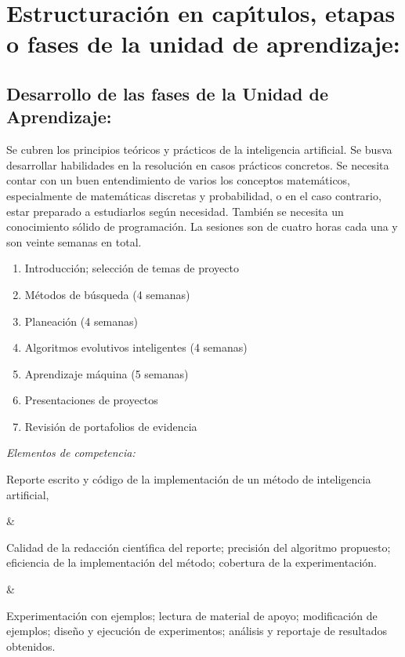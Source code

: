 \documentclass[10 pt]{article}
\begin{document}
\newpage
\section{Estructuraci\'{o}n en cap\'{\i}tulos, etapas o fases de la unidad de
  aprendizaje:}
\subsection{Desarrollo de las fases de la Unidad de Aprendizaje:}

Se cubren los principios te\'{o}ricos y pr\'{a}cticos de la
inteligencia artificial. Se busva desarrollar habilidades en la
resoluci\'{o}n en casos pr\'{a}cticos concretos. Se necesita contar
con un buen entendimiento de varios los conceptos matem\'{a}ticos,
especialmente de matem\'{a}ticas discretas y probabilidad, o en el
caso contrario, estar preparado a estudiarlos seg\'{u}n
necesidad. Tambi\'{e}n se necesita un conocimiento s\'{o}lido de
programaci\'{o}n.  La sesiones son de cuatro horas cada una y son
veinte semanas en total.
\begin{enumerate}[itemsep=-3pt]
\item{Introducci\'{o}n; selecci\'{o}n de temas de proyecto}
\item{M\'{e}todos de b\'{u}squeda (4 semanas)}
\item{Planeaci\'{o}n (4 semanas)}
\item{Algoritmos evolutivos inteligentes (4 semanas)}
\item{Aprendizaje m\'{a}quina (5 semanas)}
\item{Presentaciones de proyectos}
\item{Revisi\'{o}n de portafolios de evidencia}
\end{enumerate}

{\em Elementos de competencia:}



Reporte escrito y c\'{o}digo de la implementaci\'{o}n de un
m\'{e}todo de inteligencia artificial,

&

Calidad de la redacci\'{o}n cient\'{\i}fica del reporte; precisi\'{o}n
del algoritmo propuesto; eficiencia de la implementaci\'{o}n del
m\'{e}todo; cobertura de la experimentaci\'{o}n.

&

Experimentaci\'{o}n con ejemplos; lectura de material de apoyo;
modificaci\'{o}n de ejemplos; dise\~{n}o y ejecuci\'{o}n de
experimentos; an\'{a}lisis y reportaje de resultados obtenidos.
\end{document}
